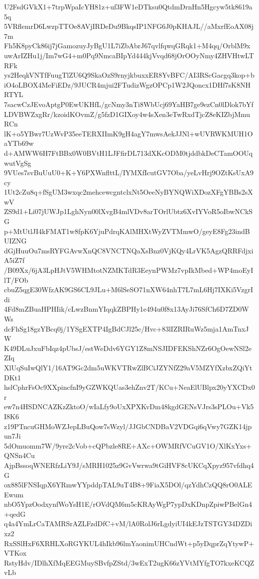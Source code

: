 U2FsdGVkX1+7trpWpaIcYH81z+uf3FW1eDTksu0QtdmDrnHn5Hgcyw5tk8619a5q
5VRflemrD6LwzpTTOe8AVjIRDeDu9BkqsIP1NFG6J0pKHAJL//aMxrfEoAX08j7m
Fh5K8pyCk86ij7jGamozuyJyBgU1L7iZbAbrJ67qvlfqwqGRqk1+M4qq/OrblM9x
uwArIZHu1j/Im7wG4+m0Pq9NmcaBIpYd444kjVvqd68jOrOOyNmy4ZHVHtwLTRFk
ys2HeqkVNTfFuugTlZU6Q9SkaOzS9rnyjkbuxxER8YvBFC/AI3RScGacgq3kop+b
iO4oLBOX4MeFiEDz/9JUCR4mjui2FTudizWgzOPCp1W2JQoncx1DHf7sK8NHRTYL
7sacwCzJEvoAptgP0EwUKHfL/gcNmy3nTi8WbUcj69YaHB7ge9ezCn0lDlok7bYf
LDVBWZxgRr/kzoidKOvmZ/g5fzD1GIXoy4w4sXen3eTwRxdTjcZ8eKIZbjMmuRCn
lK+o5YBwr7UzWvP35eeTERXIImK9gH4agY7mwsAekJJNl+wUVRWKMUH1OaYTb69w
d+AMWW6H7FtBBx0W0BVtH1LJFfirDL713dXKcODM0tjddbkDeCTamOOUqwutVgSg
9VUes7svBuUuU0+K+Y6PXWnflttL/IYMXfIcutGV7Oba/yeLvHrj9OZtKsUxA9cy
1Ut2cZu8q+fSgUM3wxqc2mehcewcgntclxNt5OeeNyBYNQWiXDozXFgYBBs2sXwV
ZS9d1+Li07jUWJp1LghNyn00lXvgB4mlVDv8arTOrlUbtz6XvIYVoR5oIbwNCkSG
p+MtUtlJI4kFMAT1w8fpK6YjuPdrqKAlMHXtWyZVTMmwO/geyE8Fg23indBUIZNG
dGjHuuOu7msRYFGAvwXnQC8VNCTNQaXsBnz0VjKQy4LrVK5AgzQRRFdjxiA5iZ7f
/B09Xx/6jA3LpHJtV5WHMtotNZMKTdR3EeynPWMz7vpIkMbed+WP4moEyIlT/FOb
cbuZ5qgE30WfzAK9GS6CL9JLu+M6lSeSO71nXW64nhT7L7mL6Hj7IXKi5VzgrIdi
4Fd8mZBuaHPHIik/cLwzBnmYIqqkZBPHy1e494u0f8x13AyJi76SfCh6D7ZD0WWs
dcFhSg18gzYBcq0j/1YSgEXTP4IgBdCJl25c/Hvc+83lIZRIRuWz5mja1AmTnxJW
K49DLuJxuFbIqz4pUbsJ/estWeDdv6YGY1Z8mNSJIDFEKShNZr6OgOewNSl2eZIq
XlUqSuIwQlY1/16AT9Gc2dm5uWKVTRwZlBCiJZYNfZ29aV5MZYfXzbxZQiYtDKt1
hslCphrFsOc9XXpincfnI9yGZWKQUas3ehZnv2T/KCu+NeaElUBlpx20yYXCDx0r
ew7n4HSDNCAZKzZktoO/wIaLfy9oUxXPXKvDm48kgdGENsVJrs3sPLOu+Vk5I8K6
z19PTncuGHMoWZJepLBuQow7sWzyl/JJGbCNDBaV2VDGqi6qVwy7GZK14jpun7Ji
5dOmuomm7W/9yre2cVob+cQPbzle8RE+AXc+OWMRfVCuGV1O/XlKxYxs+QNSn4Cu
AjpBssoqWNERfzLiY9J/sMRH1025z9GvVwrwa9tGiHVF8cUKCqXpyz957vfdhq4G
ox885lFNSIqpX6YRmwYYpddpTAL9uT4B8+9FiaX5DOl/qzYdhCzQQ8rO0ALEEwum
nbO5YpzOodxynfWoYsH1E/rOVdQM6m5cKRAyWgP7ypDxKDnpZpiwPBelGn4+qedG
q4a4YmLrCaTAMRSrAZLFzdDfC+vM/lA0RolJ6rLgdyiUI4kEJzTSTGY34DZDixz2
RxSSlHxF6XRHLXoRGYKUL4hIkb96lmYaonimUHCndWt+p5yDqprZqYtywP+VTKox
RstyHdv/IDlhXfMqEEGMuySBvfpZStd/3wExT2ugK66zYVtMYfgTO7kxeKCQZvLb
